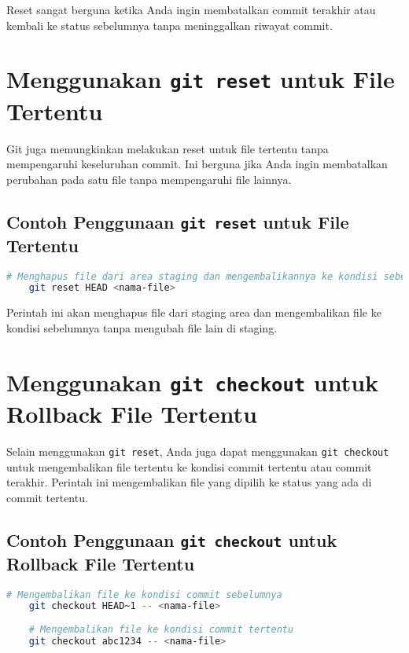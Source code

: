 Reset sangat berguna ketika Anda ingin membatalkan commit terakhir atau kembali ke status sebelumnya tanpa meninggalkan riwayat commit.

\section{Menggunakan \texttt{git reset} untuk File Tertentu}

Git juga memungkinkan melakukan reset untuk file tertentu tanpa mempengaruhi keseluruhan commit. Ini berguna jika Anda ingin membatalkan perubahan pada satu file tanpa mempengaruhi file lainnya.

\subsection{Contoh Penggunaan \texttt{git reset} untuk File Tertentu}

\begin{lstlisting}[language=bash]
	# Menghapus file dari area staging dan mengembalikannya ke kondisi sebelum di-commit
	git reset HEAD <nama-file>
\end{lstlisting}

Perintah ini akan menghapus file dari staging area dan mengembalikan file ke kondisi sebelumnya tanpa mengubah file lain di staging.

\section{Menggunakan \texttt{git checkout} untuk Rollback File Tertentu}

Selain menggunakan \texttt{git reset}, Anda juga dapat menggunakan \texttt{git checkout} untuk mengembalikan file tertentu ke kondisi commit tertentu atau commit terakhir. Perintah ini mengembalikan file yang dipilih ke status yang ada di commit tertentu.

\subsection{Contoh Penggunaan \texttt{git checkout} untuk Rollback File Tertentu}

\begin{lstlisting}[language=bash]
	# Mengembalikan file ke kondisi commit sebelumnya
	git checkout HEAD~1 -- <nama-file>
	
	# Mengembalikan file ke kondisi commit tertentu
	git checkout abc1234 -- <nama-file>
\end{lstlisting}

